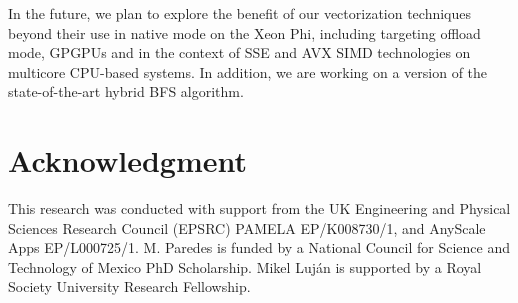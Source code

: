 \documentclass{sig-alternate-05-2015}
\begin{document}
In the future, we plan to explore the benefit of our vectorization techniques beyond their use in native mode on the Xeon Phi, including targeting offload mode, GPGPUs and in the context of SSE and AVX SIMD technologies on multicore CPU-based systems. In addition, we are working on a version of the state-of-the-art hybrid BFS algorithm.







\section*{Acknowledgment}
This research was conducted with support from the UK Engineering and Physical Sciences Research Council (EPSRC) PAMELA EP/K008730/1, and AnyScale Apps EP/L000725/1. M. Paredes is funded by a National Council for Science and
Technology of Mexico PhD Scholarship. Mikel Luj{\'a}n is supported by a Royal Society University Research Fellowship.  




\end{document}
